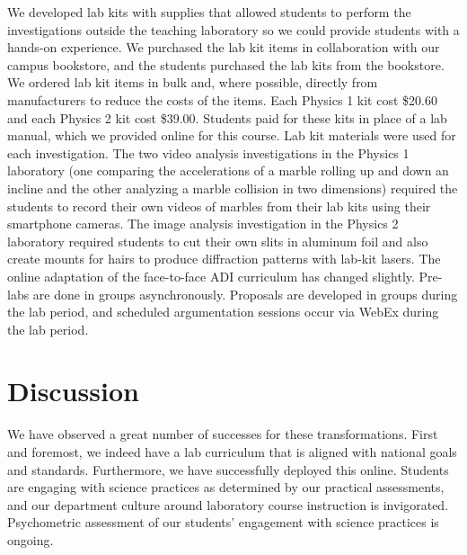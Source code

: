 \documentclass[aip, numerical, preprint]{revtex4-2}
\begin{document}
We developed lab kits with supplies that allowed students to perform the investigations outside
the teaching laboratory so we could provide students with a hands-on experience. We purchased
the lab kit items in collaboration with our campus bookstore, and the students purchased the
lab kits from the bookstore. We ordered lab kit items in bulk and, where possible, directly from
manufacturers to reduce the costs of the items. Each Physics 1 kit cost \$20.60 and each
Physics 2 kit cost \$39.00. Students paid for these kits in place of a lab manual, which we
provided online for this course. Lab kit materials were used for each investigation. The two video 
analysis investigations in the Physics 1 laboratory (one comparing the accelerations of a marble 
rolling up and down an incline and the other analyzing a marble collision in two dimensions) 
required the students to record their own videos of marbles from their lab kits using their 
smartphone cameras. The image analysis investigation in the 
Physics 2 laboratory required students to cut their own slits in aluminum foil and also create mounts 
for hairs to produce diffraction patterns with lab-kit lasers. The online adaptation of the face-to-face 
ADI curriculum has changed slightly. Pre-labs are done in groups asynchronously.  Proposals are 
developed in groups during the lab period, and scheduled argumentation sessions occur via 
WebEx during the lab period.

\section{Discussion}
We have observed a great number of successes for these transformations.  First and foremost, we
indeed have a lab curriculum that is aligned with national goals and standards. Furthermore, we
have successfully deployed this online.  Students are engaging with science practices as
determined by our practical assessments, and our department culture around laboratory course
instruction is invigorated. Psychometric assessment of our students' engagement with science
practices is ongoing.
\end{document}
